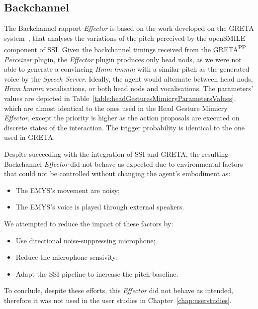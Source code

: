 \subsection{Backchannel}
\label{sub:sec:backchannel}

The Backchannel rapport \textit{Effector} is based on the work developed on the GRETA system~\cite{Niewiadomski2009}, that analyses the variations of the pitch perceived by the openSMILE component of \ac{SSI}. Given the backchannel timings received from the GRETA\textsuperscript{PP} \textit{Perceiver} plugin, the \textit{Effector} plugin produces only head nods, as we were not able to generate a convincing \textit{Hmm hmmm} with a similar pitch as the generated voice by the \textit{Speech Server}. Ideally, the agent would alternate between head nods, \textit{Hmm hmmm} vocalisations, or both head nods and vocalisations. The parameters' values are depicted in Table~\ref{table:headGesturesMimicryParametersValues}, which are almost identical to the ones used in the Head Gesture Mimicry \textit{Effector}, except the priority is higher as the action proposals are executed on discrete states of the interaction. The trigger probability is identical to the one used in GRETA.

Despite succeeding with the integration of \ac{SSI} and GRETA, the resulting Backchannel \textit{Effector} did not behave as expected due to environmental factors that could not be controlled without changing the agent's embodiment as:
\begin{itemize}
	\item The \ac{EMYS}'s movement are noisy;
	\item The \ac{EMYS}'s voice is played through external speakers.
\end{itemize}

We attempted to reduce the impact of these factors by:
\begin{itemize}
	\item Use directional noise-suppressing microphone;
	\item Reduce the microphone sensivity;
	\item Adapt the \ac{SSI} pipeline to increase the pitch baseline.
\end{itemize}

To conclude, despite these efforts, this \textit{Effector} did not behave as intended, therefore it was not used in the user studies in Chapter~\ref{chap:userstudies}.

